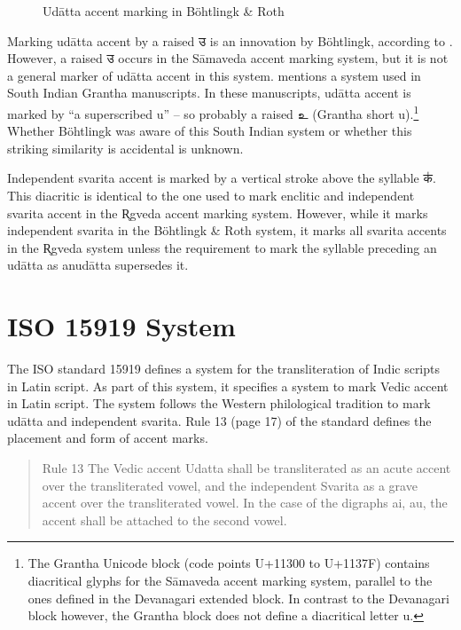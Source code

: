 \begin{figure}[!ht]
\begin{center}
\end{center}
\caption[Udātta accent marking in Böhtlingk \& Roth]{\label{fig:agotA2}Udātta accent marking in Böhtlingk \& Roth}
\end{figure}

Marking udātta accent by a raised {\devfont उ} is an innovation by Böhtlingk, according to \citet[p.~30]{Whitney1889}. However, a raised {\devfont उ} occurs in the Sāmaveda accent marking system, but it is not a general marker of udātta accent in this system. \citet[p.~485]{Witzel1974} mentions a system used in South Indian Grantha manuscripts. In these manuscripts, udātta accent is marked by “a superscribed u” – so probably a raised {\tamfont உ} (Grantha short u).\footnote{The Grantha Unicode block (code points U+11300 to U+1137F) contains diacritical glyphs for the Sāmaveda accent marking system, parallel to the ones defined in the Devanagari extended block. In contrast to the Devanagari block however, the Grantha block does not define a diacritical letter u.}  Whether Böhtlingk was aware of this South Indian system or whether this striking similarity is accidental is unknown.

Independent svarita accent is marked by a vertical stroke above the syllable {\devfont क॑}. This diacritic is identical to the one used to mark enclitic and independent svarita accent in the R̥gveda accent marking system. However, while it marks independent svarita in the Böhtlingk \& Roth system, it marks all svarita accents in the R̥gveda system unless the requirement to mark the syllable preceding an udātta as anudātta supersedes it.

\section{ISO 15919 System}

The ISO standard 15919 defines a system for the transliteration of Indic scripts in Latin script. As part of this system, it specifies a system to mark Vedic accent in Latin script. The system follows the Western philological tradition to mark udātta and independent svarita. Rule 13 (page 17) of the standard defines the placement and form of accent marks.

\begin{quote}Rule 13 The Vedic accent Udatta shall be transliterated as an acute accent over the transliterated vowel, and the independent Svarita as a grave accent over the transliterated vowel. In the case of the digraphs ai, au, the accent shall be attached to the second vowel.\end{quote}

